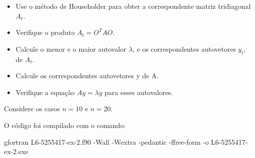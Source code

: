\documentclass[12pt, a4paper]{article} %
\begin{document}
        \begin{itemize}
            \item Use o método de Householder para obter a correspondente matriz tridiagonal $A_{t}$.
        
            \item Verifique o produto $A_{t} = O^{T}AO$.
        
            \item Calcule o menor e o maior autovalor $\lambda$, e os correspondentes autovetores $y_{t}$, de $A_{t}$.
        
            \item Calcule os correspondentes autovetores y de A.
        
            \item Verifique a equação $Ay = \lambda y$ para esses autovalores.
        
        \end{itemize}
        
        Considere os casos $n=10$ e $n=20$.
        
        O c\'odigo foi compilado com o comando:

    gfortran L6-5255417-ex-2.f90 -Wall -Wextra -pedantic -ffree-form -o L6-5255417-ex-2.exe
\end{document}
